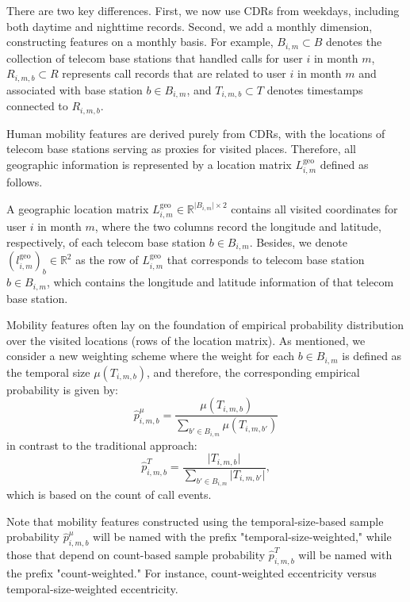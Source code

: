 There are two key differences. First, we now use CDRs from weekdays, including both daytime and nighttime records. Second, we add a monthly dimension, constructing features on a monthly basis. For example, $B_{i, m} \subset B$ denotes the collection of telecom base stations that handled calls for user $i$ in month $m$, $R_{i, m, b} \subset R$ represents call records that are related to user $i$ in month $m$ and associated with base station $b \in B_{i, m}$, and $T_{i, m, b} \subset T$ denotes timestamps connected to $R_{i, m, b}$.

Human mobility features are derived purely from CDRs, with the locations of telecom base stations serving as proxies for visited places. Therefore, all geographic information is represented by a location matrix $L^{\text{geo}}_{i, m}$ defined as follows.

\begin{definition}
A geographic location matrix $L^{\text{geo}}_{i, m} \in \mathbb{R}^{\lvert B_{i, m} \rvert \times 2}$ contains all visited coordinates for user $i$ in month $m$, where the two columns record the longitude and latitude, respectively, of each telecom base station $b \in B_{i, m}$.
Besides, we denote $(l^\text{geo}_{i, m})_b \in \mathbb{R}^2$ as the row of $L^\text{geo}_{i, m}$ that corresponds to telecom base station $b \in B_{i, m}$, which contains the longitude and latitude information of that telecom base station.
\end{definition}

Mobility features often lay on the foundation of empirical probability distribution over the visited locations (rows of the location matrix). As mentioned, we consider a new weighting scheme where the weight for each $b \in B_{i, m}$ is defined as the temporal size $\mu(T_{i, m, b})$, and therefore, the corresponding empirical probability is given by:
\begin{equation}
\hat{p}^{\mu}_{i, m, b}
=
\frac{\mu(T_{i, m, b})}{\sum_{b' \in B_{i, m}} \mu(T_{i, m, b'})}
\end{equation}
in contrast to the traditional approach:
\begin{equation}
\hat{p}^{T}_{i, m, b}
=
\frac{\lvert T_{i, m, b} \rvert}{\sum_{b' \in B_{i, m}} \lvert T_{i, m, b'} \rvert},
\end{equation}
which is based on the count of call events.

Note that mobility features constructed using the temporal-size-based sample probability $\hat{p}^\mu_{i, m, b}$ will be named with the prefix "temporal-size-weighted," while those that depend on count-based sample probability $\hat{p}^T_{i, m, b}$ will be named with the prefix "count-weighted."
For instance, count-weighted eccentricity versus temporal-size-weighted eccentricity.

